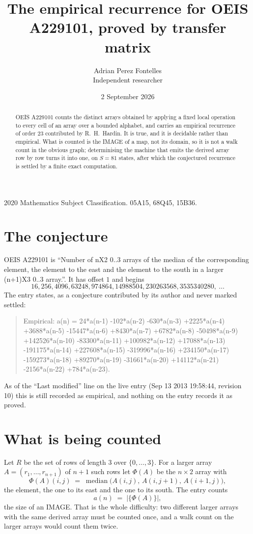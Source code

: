 \documentclass[11pt,a4paper]{article}
\title{The empirical recurrence for OEIS A229101, proved by transfer matrix}
\author{Adrian Perez Fontelles\\ \small Independent researcher}
\date{2 September 2026}
\theoremstyle{plain}
\theoremstyle{definition}
\begin{document}
\maketitle

\begin{abstract}
OEIS A229101 counts the distinct arrays obtained by applying a fixed local operation to every cell
of an array over a bounded alphabet, and carries an empirical recurrence of order $23$
contributed by R.~H.~Hardin. It is true, and it is decidable rather than empirical. What is
counted is the IMAGE of a map, not its domain, so it is not a walk count in the obvious graph;
determinising the machine that emits the derived array row by row turns it into one, on
$S=81$ states, after which the conjectured recurrence is settled by a finite exact
computation.
\end{abstract}

\noindent\small 2020 Mathematics Subject Classification. 05A15, 68Q45, 15B36.\normalsize

\section{The conjecture}

OEIS A229101 is ``Number of nX2 0..3 arrays of the median of the corresponding element, the element to the east and the element to the south in a larger (n+1)X3 0..3 array.''. It has offset $1$ and begins
\[
16, 256, 4096, 63248, 974864, 14988504, 230263568, 3535340280,\ \dots
\]
The entry states, as a conjecture contributed by its author and never marked settled:
\begin{quote}
Empirical: a(n) = 24*a(n-1) -102*a(n-2) -630*a(n-3) +2225*a(n-4) +3688*a(n-5) -15447*a(n-6) +8430*a(n-7) +6782*a(n-8) -50498*a(n-9) +142526*a(n-10) -83300*a(n-11) +100982*a(n-12) +17088*a(n-13) -191175*a(n-14) +227608*a(n-15) -319996*a(n-16) +234150*a(n-17) -159273*a(n-18) +89270*a(n-19) -31661*a(n-20) +14112*a(n-21) -2156*a(n-22) +784*a(n-23).
\end{quote}
As of the ``Last modified'' line on the live entry (Sep 13 2013 19:58:44, revision 10) this is still
recorded as empirical, and nothing on the entry records it as proved.

\section{What is being counted}

Let $R$ be the set of rows of length $3$ over $\{0,\dots,3\}$.
For a larger array $A=(r_1,\dots,r_{n+1})$ of $n+1$ such rows let $\Phi(A)$ be the
$n\times2$ array with
\[
\Phi(A)(i,j)\;=\;\operatorname{median}\bigl(A(i,j),\,A(i,j+1),\,A(i+1,j)\bigr),
\]
the element, the one to its east and the one to its south. The entry counts
\[
a(n)\;=\;\bigl|\{\Phi(A)\}\bigr| ,
\]
the size of an IMAGE. That is the whole difficulty: two different larger arrays with the same
derived array must be counted once, and a walk count on the larger arrays would count them
twice.
\end{document}
